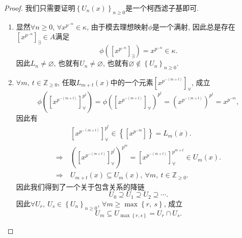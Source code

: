 \documentclass[UTF8, twoside]{ctexart}
\theoremstyle{nonumberplain}
\newtheorem{proof}{\heiti 证明}  %
\theoremstyle{nonumberplain}
\theoremstyle{plain}
\begin{document}
	\begin{proof}
		我们只需要证明${{\left\{ {{U}_{n}}\left( x \right) \right\}}_{n\ge 0}}$是一个柯西滤子基即可.
		\vskip 0.3cm
		\begin{enumerate}
			\item 显然$\forall n\ge 0$, $\forall x^{p^{-n}}\in \kappa $, 由于模去理想映射$\phi $是一个满射, 因此总是存在$\left[ {{x}^{{{p}^{-n}}}} \right]_{\exists} \in A$满足
			\[
				\phi \left( \left[ {{x}^{{{p}^{-n}}}} \right]_{\exists} \right)={{x}^{{{p}^{-n}}}}\in \kappa .
			\]
			因此${{L}_{n}}\ne \varnothing $, 也就有${{U}_{n}}\ne \varnothing $, 也就有$\varnothing \notin {{\left\{ {{U}_{n}} \right\}}_{n\ge 0}}$.
			\vskip 0.3cm
			
			\item $\forall m,\ t\in {{\mathbb{Z}}_{\ge 0}}$, 任取${{L}_{m+t}}\left( x \right)$中的一个元素${{\left[ {{x}^{{{p}^{-\left( m+t \right)}}}} \right]}_{\forall }}$, 成立
			\[
				\phi \left( \left[ {{x}^{{{p}^{-\left( m+t \right)}}}} \right]_{\forall }^{{{p}^{t}}} \right)=\phi {{\left( {{\left[ {{x}^{{{p}^{-\left( m+t \right)}}}} \right]}_{\forall }} \right)}^{{{p}^{t}}}}={{\left( {{x}^{{{p}^{-\left( m+t \right)}}}} \right)}^{{{p}^{t}}}}={{x}^{{{p}^{-m}}}},
			\]
			因此有
			\begin{align*}
				& \left[ {{x}^{{{p}^{-\left( m+t \right)}}}} \right]_{\forall }^{{{p}^{t}}}\in \left\{ \left[ {{x}^{{{p}^{-m}}}} \right] \right\}={{L}_{m}}\left( x \right). \\ 
				\Longrightarrow\ & {{\left( \left[ {{x}^{{{p}^{-\left( m+t \right)}}}} \right]_{\forall }^{{{p}^{t}}} \right)}^{{{p}^{m}}}}=\left[ {{x}^{{{p}^{-\left( m+t \right)}}}} \right]_{\forall }^{{{p}^{m+t}}}\in {{U}_{m}}\left( x \right). \\ 
				\Longrightarrow\ & {{U}_{m+t}}\left( x \right)\subseteq {{U}_{m}}\left( x \right),\ \forall m,\ t\in {{\mathbb{Z}}_{\ge 0}}.
			\end{align*}
			因此我们得到了一个关于包含关系的降链
			\begin{equation} \label{202103041330}
				{{U}_{0}}\supseteq {{U}_{1}}\supseteq {{U}_{2}}\supseteq \cdots .
			\end{equation}
			因此$\forall {{U}_{r}},\ {{U}_{s}}\in {{\left\{ {{U}_{n}} \right\}}_{n\ge 0}}$, $\forall m\ge \max \left\{ r,\ s \right\}$, 成立
			\[
				{{U}_{m}}\subseteq {{U}_{\max \left\{ r,s \right\}}}={{U}_{r}}\cap {{U}_{s}}.
			\]
			\vskip 0.3cm
			

\end{enumerate}
\end{proof}
\end{document}
